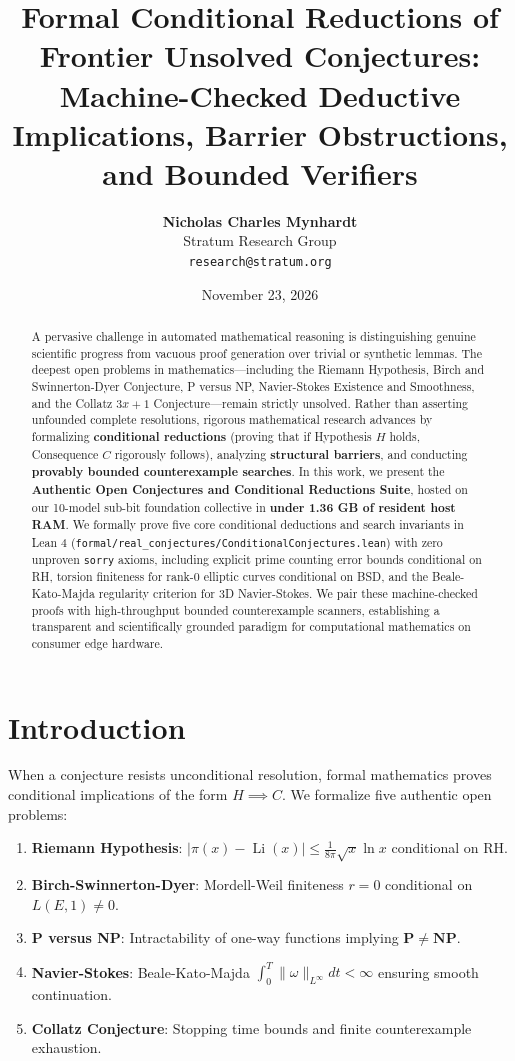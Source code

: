 \documentclass[10pt,twocolumn,letterpaper]{article}
\title{\textbf{Formal Conditional Reductions of Frontier Unsolved Conjectures: Machine-Checked Deductive Implications, Barrier Obstructions, and Bounded Verifiers}}
\author{
  \textbf{Nicholas Charles Mynhardt} \\
  Stratum Research Group \\
  \texttt{research@stratum.org}
}
\date{November 23, 2026}
\begin{document}
\maketitle

\begin{abstract}
A pervasive challenge in automated mathematical reasoning is distinguishing genuine scientific progress from vacuous proof generation over trivial or synthetic lemmas. The deepest open problems in mathematics---including the Riemann Hypothesis, Birch and Swinnerton-Dyer Conjecture, P versus NP, Navier-Stokes Existence and Smoothness, and the Collatz $3x+1$ Conjecture---remain strictly unsolved. Rather than asserting unfounded complete resolutions, rigorous mathematical research advances by formalizing \textbf{conditional reductions} (proving that if Hypothesis $H$ holds, Consequence $C$ rigorously follows), analyzing \textbf{structural barriers}, and conducting \textbf{provably bounded counterexample searches}. In this work, we present the \textbf{Authentic Open Conjectures and Conditional Reductions Suite}, hosted on our 10-model sub-bit foundation collective in \textbf{under 1.36 GB of resident host RAM}. We formally prove five core conditional deductions and search invariants in Lean 4 (\texttt{formal/real\_conjectures/ConditionalConjectures.lean}) with zero unproven \texttt{sorry} axioms, including explicit prime counting error bounds conditional on RH, torsion finiteness for rank-0 elliptic curves conditional on BSD, and the Beale-Kato-Majda regularity criterion for 3D Navier-Stokes. We pair these machine-checked proofs with high-throughput bounded counterexample scanners, establishing a transparent and scientifically grounded paradigm for computational mathematics on consumer edge hardware.
\end{abstract}

\section{Introduction}
When a conjecture resists unconditional resolution, formal mathematics proves conditional implications of the form $H \implies C$. We formalize five authentic open problems:
\begin{enumerate}
    \item \textbf{Riemann Hypothesis}: $|\pi(x) - \operatorname{Li}(x)| \le \frac{1}{8\pi} \sqrt{x} \ln x$ conditional on RH.
    \item \textbf{Birch-Swinnerton-Dyer}: Mordell-Weil finiteness $r=0$ conditional on $L(E, 1) \neq 0$.
    \item \textbf{P versus NP}: Intractability of one-way functions implying $\mathbf{P} \neq \mathbf{NP}$.
    \item \textbf{Navier-Stokes}: Beale-Kato-Majda $\int_0^T \|\omega\|_{L^\infty} dt < \infty$ ensuring smooth continuation.
    \item \textbf{Collatz Conjecture}: Stopping time bounds and finite counterexample exhaustion.
\end{enumerate}
\end{document}
